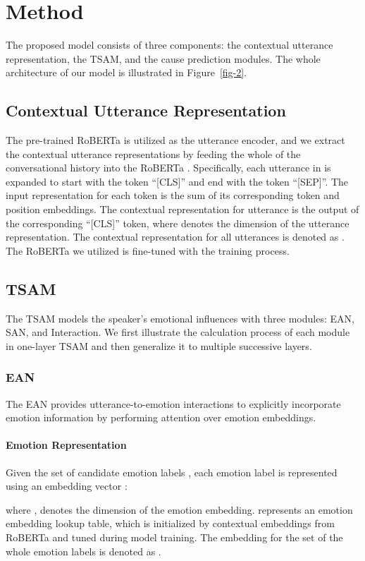 \documentclass[11pt]{article}
\begin{document}
\section{Method}
The proposed model consists of three components: the contextual utterance representation, the TSAM, and the cause prediction modules. The whole architecture of our model is illustrated in Figure~\ref{fig-2}.

\subsection{Contextual Utterance Representation}
The pre-trained RoBERTa is utilized as the utterance encoder, and we extract the contextual utterance representations by feeding the whole of the conversational history  into the RoBERTa \citep{liu2019roberta}.
Specifically, each utterance in  is expanded to start with the token ``[CLS]'' and end with the token ``[SEP]''. The input representation for each token is the sum of its corresponding token and position embeddings. The contextual representation  for utterance  is the output of the corresponding ``[CLS]'' token, where  denotes the dimension of the utterance representation. The contextual representation for all utterances is denoted as . The RoBERTa we utilized is fine-tuned with the training process.

\subsection{TSAM}
The TSAM models the speaker's emotional influences with three modules: EAN, SAN, and Interaction. We first illustrate the calculation process of each module in one-layer TSAM and then generalize it to multiple successive layers.


\subsubsection{EAN}
The EAN provides utterance-to-emotion interactions to explicitly incorporate emotion information by performing attention over emotion embeddings.

\paragraph{Emotion Representation} Given the set of candidate emotion labels , each emotion label  is represented using an embedding vector \citep{cui2019hierarchically}:

where ,  denotes the dimension of the emotion embedding.  represents an emotion embedding lookup table, which is initialized by contextual embeddings from RoBERTa and tuned during model training. The embedding for the set of the whole emotion labels is denoted as . 
\end{document}
